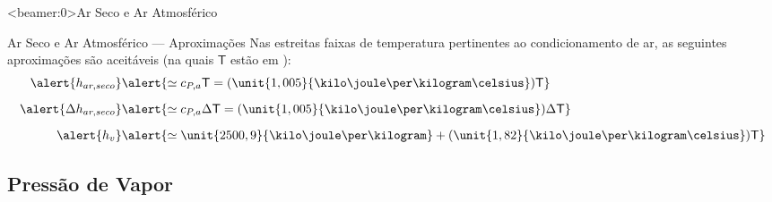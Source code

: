     {
    \begin{frame}<beamer:0>{Ar Seco e Ar Atmosférico}\vspace*{-0em}
        \THISFRAMECONTENTS
    \end{frame}}

    \begin{frame}{Ar Seco e Ar Atmosférico --- Aproximações}\vspace*{-0em}
        Nas \alert{estreitas faixas de temperatura} pertinentes ao \alert{condicionamento de
        ar}, as seguintes aproximações são aceitáveis (na quais $\mathsf{T}$ estão em \celsius):
        \begin{align*}
            \alert{h_{ar,seco}} &
            \alert{
                \simeq c_{P,a}\mathsf{T}
                = (\unit{1,005}{\kilo\joule\per\kilogram\celsius})\mathsf{T}
            }
            \\[\medskipamount]
            \alert{\Delta h_{ar,seco}} &
            \alert{
                \simeq c_{P,a}\Delta\mathsf{T}
                = (\unit{1,005}{\kilo\joule\per\kilogram\celsius})\Delta\mathsf{T}
            }
            \\[\medskipamount]
            \alert{h_{v}} &
            \alert{
                \simeq \unit{2500,9}{\kilo\joule\per\kilogram}
                + (\unit{1,82}{\kilo\joule\per\kilogram\celsius})\mathsf{T}
            }
        \end{align*}
    \end{frame}

\subsection{Pressão de Vapor}

